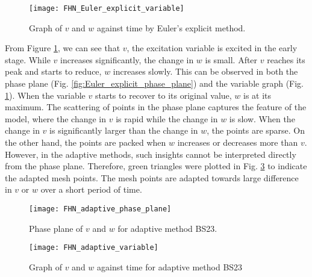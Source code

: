 \begin{figure}
    \texttt{[image: FHN\_Euler\_explicit\_variable]}
    \caption{Graph of $v$ and $w$ against time by Euler's explicit method.}
    \label{fig:Euler_explicit_variable}
\end{figure}


From Figure \ref{fig:Euler_explicit_variable}, we can see that $v$, the excitation variable is excited in the early stage. While $v$ increases significantly, the change in $w$ is small. After $v$ reaches its peak and starts to reduce, $w$ increases slowly. This can be observed in both the phase plane (Fig. \ref{fig:Euler_explicit_phase_plane}) and the variable graph (Fig. \ref{fig:Euler_explicit_variable}). When the variable $v$ starts to recover to its original value, $w$ is at its maximum. The scattering of points in the phase plane captures the feature of the model, where the change in $v$ is rapid while the change in $w$ is slow. When the change in $v$ is significantly larger than the change in $w$, the points are sparse. On the other hand, the points are packed when $w$ increases or decreases more than $v$. However, in the adaptive methods, such insights cannot be interpreted directly from the phase plane. Therefore, green triangles were plotted in Fig. \ref{fig:adaptive_variable} to indicate the adapted mesh points. The mesh points are adapted towards large difference in $v$ or $w$ over a short period of time.

\begin{figure}
    \texttt{[image: FHN\_adaptive\_phase\_plane]}
    \caption{Phase plane of $v$ and $w$ for adaptive method BS23.}
    \label{fig:adaptive_phase_plane}
\end{figure}

\begin{figure}
    \texttt{[image: FHN\_adaptive\_variable]}
    \caption{Graph of $v$ and $w$ against time for adaptive method BS23}
    \label{fig:adaptive_variable}
\end{figure}

